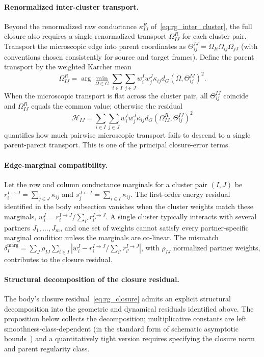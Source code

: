 \documentclass[11pt]{article}
\begin{document}
\paragraph{Renormalized inter-cluster transport.}
Beyond the renormalized raw conductance $\kappa_{IJ}^R$ of~\eqref{eq:rg_inter_cluster}, the full closure also requires a single renormalized transport $\Omega_{IJ}^R$ for each cluster pair. Transport the microscopic edge into parent coordinates as $\Theta_{ij}^{IJ} = \Omega_{Ii}\Omega_{ij}\Omega_{jJ}$ (with conventions chosen consistently for source and target frames). Define the parent transport by the weighted Karcher mean
\begin{equation}
\Omega_{IJ}^R = \arg\min_{\Omega \in G} \sum_{i \in I}\sum_{j \in J} w_i^I w_j^J \kappa_{ij} d_G(\Omega, \Theta_{ij}^{IJ})^2.
\end{equation}
When the microscopic transport is flat across the cluster pair, all $\Theta_{ij}^{IJ}$ coincide and $\Omega_{IJ}^R$ equals the common value; otherwise the residual
\begin{equation}
\mathcal{H}_{IJ} = \sum_{i \in I}\sum_{j \in J} w_i^I w_j^J \kappa_{ij} d_G(\Omega_{IJ}^R, \Theta_{ij}^{IJ})^2
\end{equation}
quantifies how much pairwise microscopic transport fails to descend to a single parent-parent transport. This is one of the principal closure-error terms.

\paragraph{Edge-marginal compatibility.}
Let the row and column conductance marginals for a cluster pair $(I, J)$ be $r_i^{I \to J} = \sum_{j \in J}\kappa_{ij}$ and $s_j^{J \leftarrow I} = \sum_{i \in I}\kappa_{ij}$. The first-order energy residual identified in the body subsection vanishes when the cluster weights match these marginals, $w_i^I = r_i^{I \to J}/\sum_{i'}r_{i'}^{I \to J}$. A single cluster typically interacts with several partners $J_1, \ldots, J_m$, and one set of weights cannot satisfy every partner-specific marginal condition unless the marginals are co-linear. The mismatch $\delta_I^{\mathrm{marg}} = \sum_J \rho_{IJ}\sum_{i \in I}|w_i^I - r_i^{I \to J}/\sum_{i'}r_{i'}^{I \to J}|$, with $\rho_{IJ}$ normalized partner weights, contributes to the closure residual.

\paragraph{Structural decomposition of the closure residual.}
The body's closure residual~\eqref{eq:rg_closure} admits an explicit structural decomposition into the geometric and dynamical residuals identified above. The proposition below collects the decomposition; multiplicative constants are left smoothness-class-dependent (in the standard form of schematic asymptotic bounds~\cite{wong2001asymptotic}) and a quantitatively tight version requires specifying the closure norm and parent regularity class.
\end{document}
